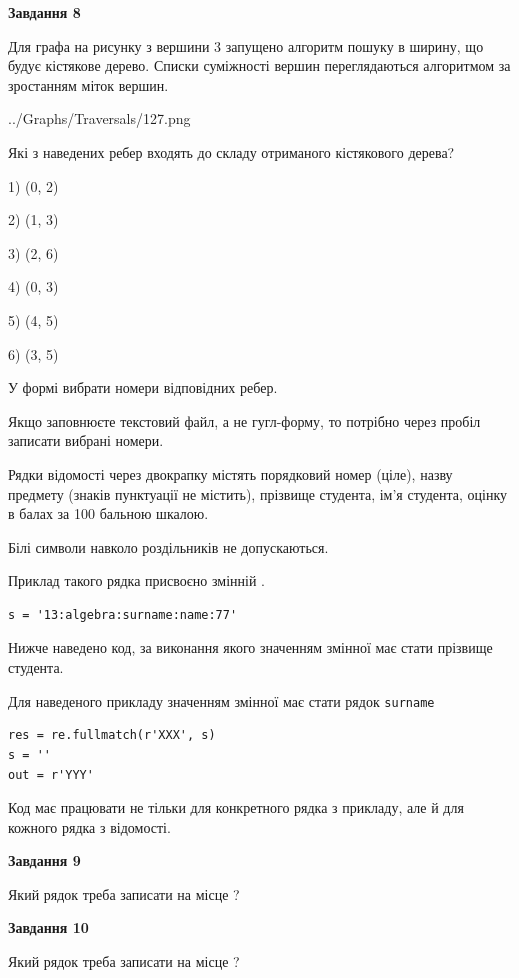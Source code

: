 \documentclass[12pt, ukrainian]{article}
\def\code#1{\Verb!#1!}
\begin{document}
{\begin {large}
{\begin {center}\textbf{Завдання 8}\end {center}}\par
Для графа на рисунку з вершини 3 запущено алгоритм пошуку в ширину, що будує кістякове дерево. Списки суміжності вершин переглядаються алгоритмом за зростанням міток вершин.\par
\begin{center}
	{../Graphs/Traversals/127.png}
\end{center}
\par Які з наведених ребер входять до складу отриманого кістякового дерева?\par
1) (0, 2)\par
2) (1, 3)\par
3) (2, 6)\par
4) (0, 3)\par
5) (4, 5)\par
6) (3, 5)\par
{\vskip 15pt} У формі вибрати номери відповідних ребер.


Якщо заповнюєте текстовий файл, а не гугл-форму, то потрібно через пробіл записа\-ти вибрані номери.\par
\newpage


Рядки відомості через двокрапку містять порядковий номер (ціле), назву предмету (знаків пунктуації не містить), прізвище студента, ім'я студента, оцінку в балах за 100 бальною шкалою.

Білі символи навколо роздільників не допускаються.

Приклад такого рядка присвоєно змінній .



\begin{verbatim}
s = '13:algebra:surname:name:77'
\end{verbatim}


Нижче наведено код, за виконання якого значенням змінної  має стати прізвище студента.

Для наведеного прикладу значенням змінної  має стати рядок \code{surname}



\begin{verbatim}
res = re.fullmatch(r'XXX', s)
s = ''
out = r'YYY'
\end{verbatim}


Код має працювати не тільки для конкретного рядка з прикладу, але й для кожного рядка з відомості.

{\begin {center}\textbf{Завдання 9}\end {center}}\par
Який рядок треба записати на місце  ?\par
\vspace{5mm}


{\begin {center}\textbf{Завдання 10}\end {center}}\par
Який рядок треба записати на місце  ?\par


\newpage


\end {large}}
\end{document}
